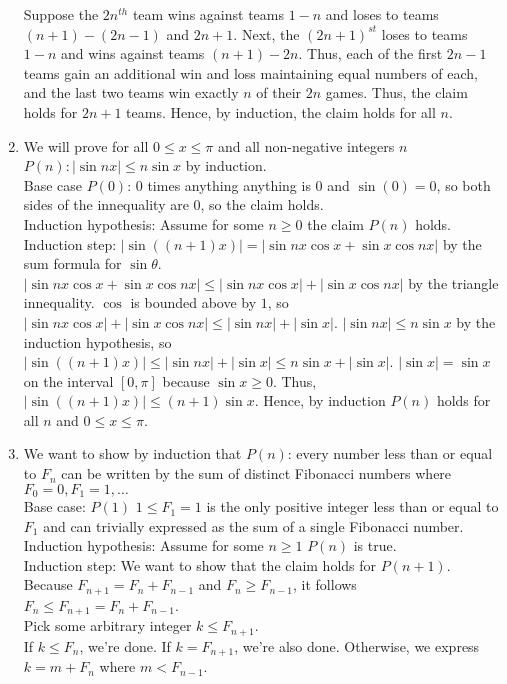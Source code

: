 \documentclass[10pt]{article}
\begin{document}
\begin{enumerate}[label= (Q-\arabic*)]
    Suppose the $2n^{th}$ team wins against teams $1-n$ and loses to teams $(n+1)-(2n-1)$ and $2n+1$. 
    Next, the ${(2n+1)}^{st}$ loses to teams $1-n$ and wins against teams $(n+1)-2n$. 
    Thus, each of the first $2n-1$ teams gain an additional win and loss maintaining equal numbers of each, and the last two teams win exactly $n$ of their $2n$ games. 
    Thus, the claim holds for $2n+1$ teams. Hence, by induction, the claim holds for all $n$.
    \item We will prove for all $0\le x\le \pi$ and all non-negative integers $n$ $P(n): |\sin nx|\le n\sin x$ by induction.\\
    Base case $P(0)$: $0$ times anything anything is $0$ and $\sin(0)=0$, so both sides of the innequality are $0$, so the claim holds.\\
    Induction hypothesis: Assume for some $n\ge0$ the claim $P(n)$ holds.\\
    Induction step: $|\sin ((n+1)x)|=|\sin nx \cos x+\sin x\cos nx|$ by the sum formula for $\sin\theta$. 
    $|\sin nx \cos x+\sin x\cos nx|\le|\sin nx\cos x|+|\sin x \cos nx|$ by the triangle innequality.
    $\cos$ is bounded above by $1$, so $|\sin nx\cos x|+|\sin x \cos nx|\le|\sin nx|+|\sin x|$.
    $|\sin nx|\le n\sin x$ by the induction hypothesis, so $|\sin((n+1)x)|\le |\sin nx|+|\sin x|\le n\sin x+|\sin x|$.
    $|\sin x|=\sin x$ on the interval $[0,\pi]$ because $\sin x\ge 0$.
    Thus, $|\sin((n+1)x)|\le(n+1)\sin x$.
    Hence, by induction $P(n)$ holds for all $n$ and $0\le x\le \pi$.
    \item We want to show by induction that $P(n)$: every number less than or equal to $F_n$ can be written by the sum of distinct Fibonacci numbers where $F_0=0,F_1=1,\ldots$\\
    Base case: $P(1)$ $1\le F_1=1$ is the only positive integer less than or equal to $F_1$ and can trivially expressed as the sum of a single Fibonacci number. \\
    Induction hypothesis: Assume for some $n\ge1$ $P(n)$ is true.\\
    Induction step: We want to show that the claim holds for $P(n+1)$. \\
    Because $F_{n+1}=F_n+F_{n-1}$ and $F_n\ge F_{n-1}$, it follows $F_n\le F_{n+1}=F_n+F_{n-1}$. \\
    Pick some arbitrary integer $k\le F_{n+1}$. \\
    If $k\le F_n$, we're done.
    If $k=F_{n+1}$, we're also done.
    Otherwise, we express $k=m+F_n$ where $m<F_{n-1}$.\\

\end{enumerate}
\end{document}

